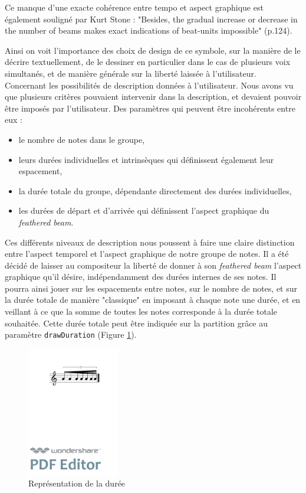 \documentclass{article}
\newenvironment{gmncode}	{\vspace{-2mm}\small\verbatim}{\endverbatim\vspace{-2mm}}
\newcommand{\code}[1]		{{\small \texttt{#1}}}
\begin{document}
Ce manque d'une exacte cohérence entre tempo et aspect graphique est également souligné par Kurt Stone \cite{stone1980music} : "Besides, the gradual increase or decrease in the number of beams makes exact indications of beat-units impossible" (p.124).

Ainsi on voit l'importance des choix de design de ce symbole, sur la manière de le décrire textuellement, de le dessiner en particulier dans le cas de plusieurs voix simultanés, et de manière générale sur la liberté laissée à l'utilisateur.
\\

Concernant les possibilités de description données à l'utilisateur. Nous avons vu que plusieurs critères pouvaient intervenir dans la description, et devaient pouvoir être imposés par l'utilisateur. Des paramètres qui peuvent être incohérents entre eux :
\begin{itemize}
\item le nombre de notes dans le groupe,
\item leurs durées individuelles et intrinsèques qui définissent également leur espacement,
\item la durée totale du groupe, dépendante directement des durées individuelles,
\item les durées de départ et d'arrivée qui définissent l'aspect graphique du \emph{feathered beam}.
\end{itemize}
\bigskip

Ces différents niveaux de description nous poussent à faire une claire distinction entre l'aspect temporel et l'aspect graphique de notre groupe de notes.  Il a été décidé de laisser au compositeur la liberté de donner à son \emph{feathered beam} l'aspect graphique qu'il désire, indépendamment des durées internes de ses notes. Il pourra ainsi jouer sur les espacements entre notes, sur le nombre de notes, et sur la durée totale de manière "classique" en imposant à chaque note une durée, et en veillant à ce que la somme de toutes les notes corresponde à la durée totale souhaitée. Cette durée totale peut être indiquée sur la partition grâce au paramètre \code{drawDuration} (Figure \ref{fig:fbeamduree}).

\begin{figure}[h]
\centering
\begin{gmncode}
[ 
  \fBeam<drawDuration="true">
  ( a/8 a a/16 a a a/32 a ) 
]
\end{gmncode}
\includegraphics[width=40mm]{img/fbeamduree.pdf}
\caption{Représentation de la durée}
\label{fig:fbeamduree}
\end{figure}
\end{document}
